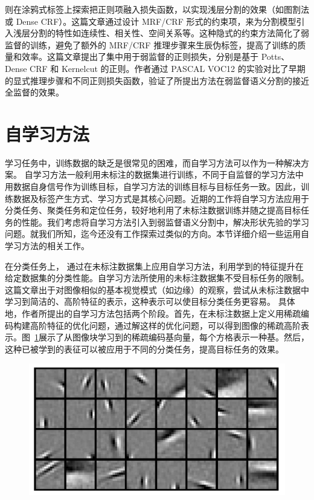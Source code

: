 \citet{tang2018regularized}则在涂鸦式标签上探索把正则项融入损失函数，以实现浅层分割的效果（如图割法或 Dense CRF）。这篇文章通过设计 MRF/CRF 形式的约束项，来为分割模型引入浅层分割的特性如连续性、相关性、空间关系等。这种隐式的约束方法简化了弱监督的训练，避免了额外的 MRF/CRF 推理步骤来生辰伪标签，提高了训练的质量和效率。这篇文章提出了集中用于弱监督的正则损失，分别是基于 Potts、Dense CRF 和 Kernelcut 的正则。作者通过 PASCAL VOC12 的实验对比了早期的显式推理步骤和不同正则损失函数，验证了所提出方法在弱监督语义分割的接近全监督的效果。


\section{自学习方法}
学习任务中，训练数据的缺乏是很常见的困难，而自学习方法可以作为一种解决方案。
自学习方法一般利用未标注的数据集进行训练，不同于自监督的学习方法中用数据自身信号作为训练目标，自学习方法的训练目标与目标任务一致。因此，训练数据及标签产生方式、学习方式是其核心问题。近期的工作将自学习方法应用于分类任务\citep{raina2007self,wang2013robust,feng2020autoencoder}、聚类任务\citep{li2017self,dai2008self,}和定位任务\citep{bazzani2016self,jie2017deep}，较好地利用了未标注数据训练并随之提高目标任务的性能。我们考虑将自学习方法引入到弱监督语义分割中，解决形状先验的学习问题。就我们所知，迄今还没有工作探索过类似的方向。本节详细介绍一些运用自学习方法的相关工作。

在分类任务上，\citet{raina2007self} 通过在未标注数据集上应用自学习方法，利用学到的特征提升在给定数据集的分类性能。自学习方法所使用的未标注数据集不受目标任务的限制。这篇文章出于对图像相似的基本视觉模式（如边缘）的观察，尝试从未标注数据中学习到简洁的、高阶特征的表示，这种表示可以使目标分类任务更容易。
具体地，作者所提出的自学习方法包括两个阶段。首先，在未标注数据上定义用稀疏编码构建高阶特征的优化问题，通过解这样的优化问题，可以得到图像的稀疏高阶表示。图~\ref{c2_fig7}展示了从图像块学习到的稀疏编码基向量，每个方格表示一种基。然后，这种已被学到的表征可以被应用于不同的分类任务，提高目标任务的效果。
    \begin{figure}[tbp]
        \centering 
        \includegraphics[width=1.0\textwidth]{img/c2/rel_b1.png}
        \label{c2_fig7}
    \end{figure}


